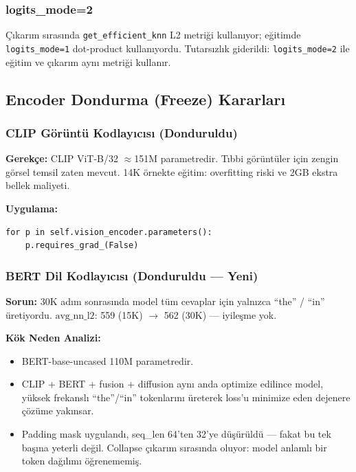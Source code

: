 \documentclass[12pt,a4paper]{article}
\begin{document}
\subsubsection{logits\_mode=2}

Çıkarım sırasında \texttt{get\_efficient\_knn} L2 metriği kullanıyor; eğitimde \texttt{logits\_mode=1} dot-product kullanıyordu. Tutarsızlık giderildi: \texttt{logits\_mode=2} ile eğitim ve çıkarım aynı metriği kullanır.

\subsection{Encoder Dondurma (Freeze) Kararları}

\subsubsection{CLIP Görüntü Kodlayıcısı (Donduruldu)}

\textbf{Gerekçe:} CLIP ViT-B/32 $\approx$151M parametredir. Tıbbi görüntüler için zengin görsel temsil zaten mevcut. 14K örnekte eğitim: overfitting riski ve 2GB ekstra bellek maliyeti.

\textbf{Uygulama:}
\begin{verbatim}
for p in self.vision_encoder.parameters():
    p.requires_grad_(False)
\end{verbatim}

\subsubsection{BERT Dil Kodlayıcısı (Donduruldu --- Yeni)}

\textbf{Sorun:} 30K adım sonrasında model tüm cevaplar için yalnızca ``the'' / ``in'' üretiyordu. $\text{avg\_nn\_l2}$: 559 (15K) $\to$ 562 (30K) --- iyileşme yok.

\textbf{Kök Neden Analizi:}

\begin{itemize}
    \item BERT-base-uncased 110M parametredir.
    \item CLIP + BERT + fusion + diffusion aynı anda optimize edilince model, yüksek frekanslı ``the''/``in'' tokenlarını üreterek loss'u minimize eden dejenere çözüme yakınsar.
    \item Padding mask uygulandı, seq\_len 64'ten 32'ye düşürüldü --- fakat bu tek başına yeterli değil. Collapse çıkarım sırasında oluyor: model anlamlı bir token dağılımı öğrenememiş.
\end{itemize}
\end{document}
